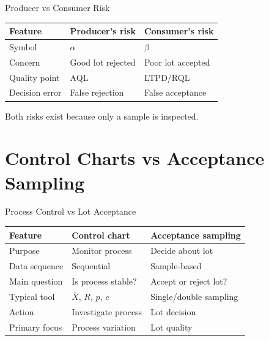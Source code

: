 \documentclass[aspectratio=169,10pt]{beamer}
\begin{document}

\begin{frame}[shrink=18]{Producer vs Consumer Risk}
\small

\begin{tabularx}{\textwidth}{YYY}
\toprule
Feature & Producer's risk & Consumer's risk\\
\midrule
Symbol & $\alpha$ & $\beta$\\
Concern & Good lot rejected & Poor lot accepted\\
Quality point & AQL & LTPD/RQL\\
Decision error & False rejection & False acceptance\\
\bottomrule
\end{tabularx}

\vspace{6pt}

Both risks exist because only a sample is inspected.

\end{frame}


\section{Control Charts vs Acceptance Sampling}

\begin{frame}[shrink=18]{Process Control vs Lot Acceptance}
\small

\begin{tabularx}{\textwidth}{YYY}
\toprule
Feature & Control chart & Acceptance sampling\\
\midrule
Purpose & Monitor process & Decide about lot\\
Data sequence & Sequential & Sample-based\\
Main question & Is process stable? & Accept or reject lot?\\
Typical tool & $\bar X$, $R$, $p$, $c$ & Single/double sampling\\
Action & Investigate process & Lot decision\\
Primary focus & Process variation & Lot quality\\
\bottomrule
\end{tabularx}

\end{frame}
\end{document}
